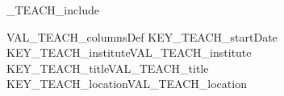 
%
\ifVAL_TEACH_include %
\begin{myTableEnv}{VAL_TEACH_columnsDef}
    \myRow
        {KEY_TEACH_startDate}{}
        {KEY_TEACH_institute}{VAL_TEACH_institute}
    \myRow
        {KEY_TEACH_title}{VAL_TEACH_title}
        {KEY_TEACH_location}{VAL_TEACH_location}
\end{myTableEnv}
%
\fi
%